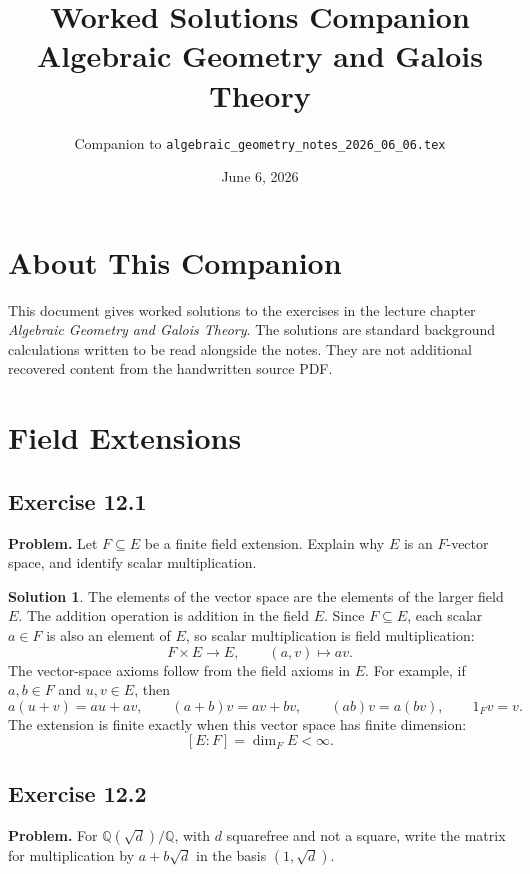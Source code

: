 \documentclass[11pt]{article}
\title{Worked Solutions Companion\\
       \large Algebraic Geometry and Galois Theory}
\author{Companion to \texttt{algebraic\_geometry\_notes\_2026\_06\_06.tex}}
\date{June 6, 2026}
\theoremstyle{definition}
\newtheorem*{solution}{Solution}
\newcommand{\Q}{\mathbb{Q}}
\begin{document}
\maketitle
\tableofcontents

\section*{About This Companion}

This document gives worked solutions to the exercises in the lecture chapter
\emph{Algebraic Geometry and Galois Theory}.  The solutions are standard
background calculations written to be read alongside the notes.  They are not
additional recovered content from the handwritten source PDF.

\section{Field Extensions}

\subsection*{Exercise 12.1}
\textbf{Problem.}  Let \(F\subseteq E\) be a finite field extension.  Explain
why \(E\) is an \(F\)-vector space, and identify scalar multiplication.

\begin{solution}
The elements of the vector space are the elements of the larger field \(E\).
The addition operation is addition in the field \(E\).  Since \(F\subseteq E\),
each scalar \(a\in F\) is also an element of \(E\), so scalar multiplication is
field multiplication:
\[
  F\times E\longrightarrow E,
  \qquad
  (a,v)\longmapsto av.
\]
The vector-space axioms follow from the field axioms in \(E\).  For example,
if \(a,b\in F\) and \(u,v\in E\), then
\[
  a(u+v)=au+av,
  \qquad
  (a+b)v=av+bv,
  \qquad
  (ab)v=a(bv),
  \qquad
  1_Fv=v.
\]
The extension is finite exactly when this vector space has finite dimension:
\[
  [E:F]=\dim_F E<\infty.
\]
\end{solution}

\subsection*{Exercise 12.2}
\textbf{Problem.}  For \(\Q(\sqrt d)/\Q\), with \(d\) squarefree and not a
square, write the matrix for multiplication by \(a+b\sqrt d\) in the basis
\((1,\sqrt d)\).
\end{document}

